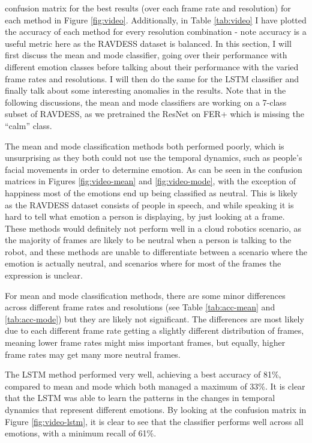 \documentclass[sigconf]{acmart}
\begin{document}
{confusion matrix for the best results (over each frame rate and resolution) for 
each method in Figure \ref{fig:video}. Additionally, in Table \ref{tab:video}
I have plotted the accuracy of each method for every resolution combination -
note accuracy is a useful metric here as the RAVDESS dataset is balanced. In
this section, I will first discuss the mean and mode
classifier, going over their performance with different emotion classes before
talking about their performance with the varied frame rates and resolutions. I will
then do the same for the LSTM classifier and finally talk about some
interesting anomalies in the results. Note that in the following discussions,
the mean and mode classifiers are working on a 7-class subset of RAVDESS, as
we pretrained the ResNet on FER+ which is missing the ``calm'' class.

The mean and mode classification methods both performed poorly, which is
unsurprising as they both could not use the temporal dynamics, such as people's
facial movements in order to determine emotion. As can be seen in the
confusion matrices in Figures
\ref{fig:video-mean} and \ref{fig:video-mode}, with the exception of
happiness most of the emotions end up being classified as neutral. This is
likely as the RAVDESS dataset consists of people in speech, and while
speaking it is hard to tell what emotion a person is displaying, by just
looking at a frame. 
These methods would definitely not perform well in a cloud robotics scenario,
as the majority of frames are likely to be neutral when a person is
talking to the robot, and these methods are unable to differentiate
between a scenario where the emotion is actually neutral, and scenarios where
for most of the frames the expression is unclear.

For mean and mode classification methods, there are some minor differences
across different frame rates and resolutions (see Table \ref{tab:acc-mean}
and \ref{tab:acc-mode}) but they are likely not
significant. The differences are most likely due to each different frame rate
getting a slightly different distribution of frames, meaning lower frame rates
might miss important frames, but equally, higher frame rates may get many more
neutral frames. 

The LSTM method performed very well, achieving a best accuracy of 81\%,
compared to mean and mode which both managed a maximum of 33\%. It is clear
that the LSTM was able to learn the patterns in the changes in temporal
dynamics that represent different emotions. By looking at the confusion matrix
in Figure \ref{fig:video-lstm}, it is clear to  see that the classifier
performs well across all emotions, with a minimum recall of 61\%. 

}
\end{document}
